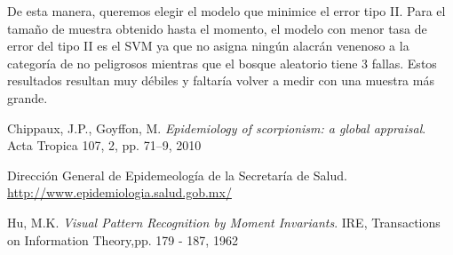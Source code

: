 \documentclass[a4paper, 10pt]{article}
\begin{document}
De esta manera, queremos elegir el modelo que minimice el error tipo II. Para el tamaño de muestra obtenido hasta el momento, el modelo con menor tasa de error del tipo II es el SVM ya que no asigna ningún alacrán venenoso a la categoría de no peligrosos mientras que el bosque aleatorio tiene 3 fallas. Estos resultados resultan muy débiles y faltaría volver a medir con una muestra más grande.

\begin{thebibliography}{9}

  Chippaux, J.P., Goyffon, M.
  \emph{Epidemiology of scorpionism: a global appraisal}.
  Acta Tropica 107, 2, pp. 71–9, 2010
  
  Dirección General de Epidemeología de la Secretaría de Salud.
  \url{http://www.epidemiologia.salud.gob.mx/}
  
  Hu, M.K.
  \emph{Visual Pattern Recognition by Moment Invariants}.
  IRE, Transactions on Information Theory,pp. 179 - 187, 1962
  
\end{thebibliography}
\end{document}
